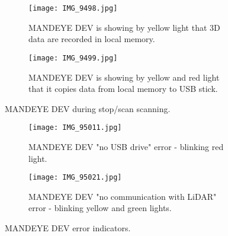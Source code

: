 \begin{figure}
	\centering
	\begin{subfigure}[b]{0.45\textwidth}
		\centering
		\texttt{[image: IMG\_9498.jpg]}
		\caption{MANDEYE DEV is showing by yellow light that 3D data are recorded in local memory.}
		\label{fig:m17}
	\end{subfigure}
	\hfill
	\begin{subfigure}[b]{0.45\textwidth}
		\centering
		\texttt{[image: IMG\_9499.jpg]}
		\caption{MANDEYE DEV is showing by yellow and red light that it copies data from local memory to USB stick.}
		\label{fig:m27}
	\end{subfigure}
	\caption{MANDEYE DEV during stop/scan scanning.}
	\label{fig:mandeye_harware4}
\end{figure}

\begin{figure}
	\centering
	\begin{subfigure}[b]{0.45\textwidth}
		\centering
		\texttt{[image: IMG\_95011.jpg]}
		\caption{MANDEYE DEV "no USB drive" error - blinking red light.}
		\label{fig:m18}
	\end{subfigure}
	\hfill
	\begin{subfigure}[b]{0.45\textwidth}
		\centering
		\texttt{[image: IMG\_95021.jpg]}
		\caption{MANDEYE DEV "no communication with LiDAR" error - blinking yellow and green lights.}
		\label{fig:m28}
	\end{subfigure}
	\caption{MANDEYE DEV error indicators.}
	\label{fig:mandeye_harware5}
\end{figure}
